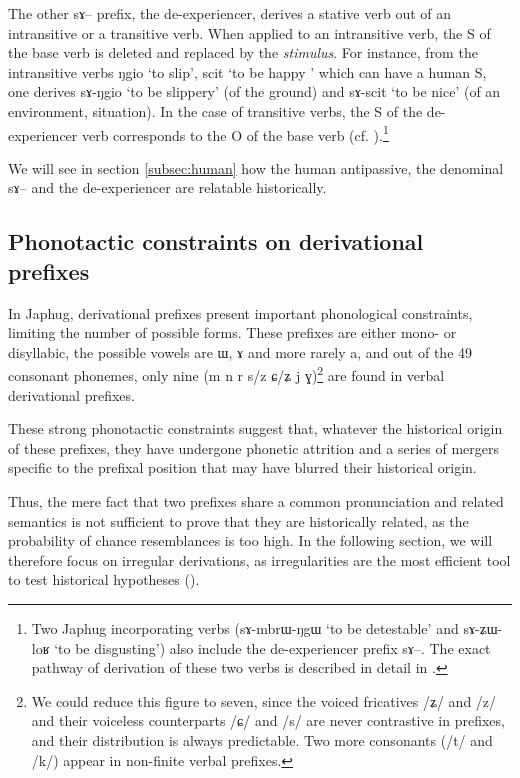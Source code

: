 \documentclass[oldfontcommands,oneside,a4paper,11pt]{article}
\newcommand{\ipa}[1]{{\phon \mbox{#1}}} %
\begin{document}
The other \ipa{sɤ}-- prefix, the de-experiencer, derives a stative verb out of an intransitive or a transitive verb. When applied to an intransitive verb, the S of the base verb is deleted and replaced by the \textit{stimulus}. For instance, from the intransitive verbs \ipa{ŋgio} `to slip', \ipa{scit}  `to be happy	' which can have a human S, one derives \ipa{sɤ-ŋgio} `to be slippery' (of the ground) and \ipa{sɤ-scit} `to be nice' (of an environment, situation).  In the case of transitive verbs, the S of the de-experiencer verb corresponds to the O of the base verb (cf. \citealt{jacques12demotion}).\footnote{Two Japhug incorporating verbs (\ipa{sɤ-mbrɯ-ŋgɯ} `to be detestable' and \ipa{sɤ-ʑɯ-loʁ} `to be disgusting') also include the de-experiencer prefix \ipa{sɤ}--. The exact pathway of derivation of these two verbs is described in detail in  \citet[§4.1]{jacques12incorp}.}
  
  We will see in section \ref{subsec:human} how the human antipassive, the denominal \ipa{sɤ}-- and the de-experiencer are relatable historically.
 


\subsection{Phonotactic constraints on derivational prefixes}
In Japhug, derivational prefixes present important phonological constraints, limiting the number of possible forms. These prefixes are either mono- or disyllabic, the possible vowels are  \ipa{ɯ}, \ipa{ɤ} and more rarely \ipa{a}, and out of the 49 consonant phonemes, only nine (m n r s/z ɕ/ʑ j ɣ)\footnote{We could reduce this figure to seven, since the voiced fricatives /ʑ/ and /z/ and their voiceless counterparts /ɕ/ and /s/ are never contrastive in prefixes, and their distribution is always predictable. Two more consonants (/t/ and /k/) appear in non-finite verbal prefixes.} are found in verbal derivational prefixes. 

These strong phonotactic constraints suggest that, whatever the historical origin of these prefixes, they have undergone phonetic attrition and a series of mergers specific to the prefixal position  that may have blurred their historical origin.

Thus, the mere fact that two prefixes share a common pronunciation and related semantics is not sufficient to prove that they are historically related, as the probability of chance resemblances is too high. In the following section, we will therefore focus on irregular derivations, as irregularities are the most efficient tool to test historical hypotheses (\citealt{schindler72apophonie}).
\end{document}
